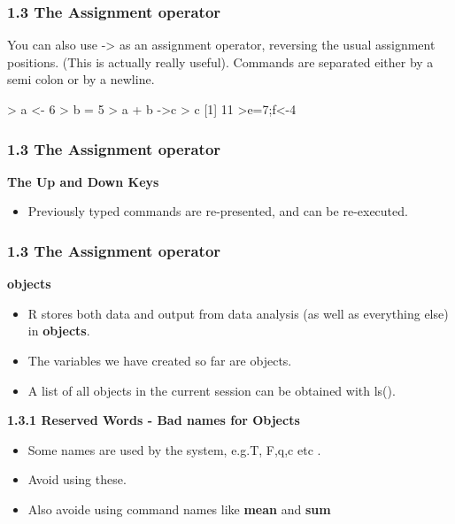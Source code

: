  
 
 \frametitle{1.3 The Assignment operator}
 
 You can also use -> as an assignment operator, reversing the
 usual assignment positions. (This is actually really useful). Commands are separated either by
 a semi colon or by a newline.
 \begin{framed}
 \begin{semiverbatim}
 > a <- 6
 > b = 5
 > a + b ->c
 > c
 [1] 11
 >e=7;f<-4
 \end{semiverbatim}
 \end{framed}
 
  
 
 \frametitle{1.3 The Assignment operator}
 \textbf{The Up and Down Keys}
 \begin{itemize}
 \itemBefore we continue, try using the up and down keys, and see what happens. 
 \item Previously
 typed commands are re-presented, and can be re-executed.
 \end{itemize}
 
 
 
 \frametitle{1.3 The Assignment operator }
 \textbf{objects}
 \begin{itemize}
 \item R stores both data and output from data analysis (as well as everything else) in \textbf{objects}.
 \item The variables we have created so far are objects. 
 \item A list of all objects in the current session can
 be obtained with ls().
 \end{itemize}
 
 
 
 
 \textbf{1.3.1 Reserved Words - Bad names for Objects}
 \begin{itemize}
 \item Some names are used by the system, e.g.T, F,q,c etc . 
 \item Avoid using these.
 \item Also avoide using command names like \textbf{mean} and \textbf{sum}
 \end{itemize}
 
